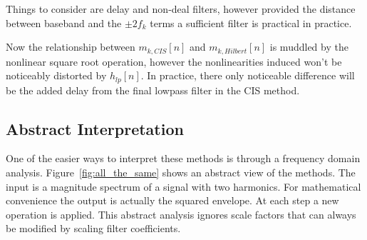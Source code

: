\documentclass [11pt, proquest,oneside] {uwthesis}[2015/03/03]
\begin{document}
Things to consider are delay and non-deal filters, however provided the distance between baseband and the $\pm2f_k$ terms a sufficient filter is practical in practice.

Now the relationship between $m_{k,CIS}[n]$ and $m_{k,Hilbert}[n]$ is muddled by the nonlinear square root operation, however the nonlinearities induced won't be noticeably distorted by $h_{lp}[n]$.  In practice, there only noticeable difference will be the added delay from the final lowpass filter in the CIS method.

\subsection{Abstract Interpretation}

One of the easier ways to interpret these methods is through a frequency domain analysis.  Figure~\ref{fig:all_the_same} shows an abstract view of the methods.  The input is a magnitude spectrum of a signal with two harmonics. For mathematical convenience the output is actually the squared envelope.  At each step a new operation is applied.  This abstract analysis ignores scale factors that can always be modified by scaling filter coefficients.
\end{document}
